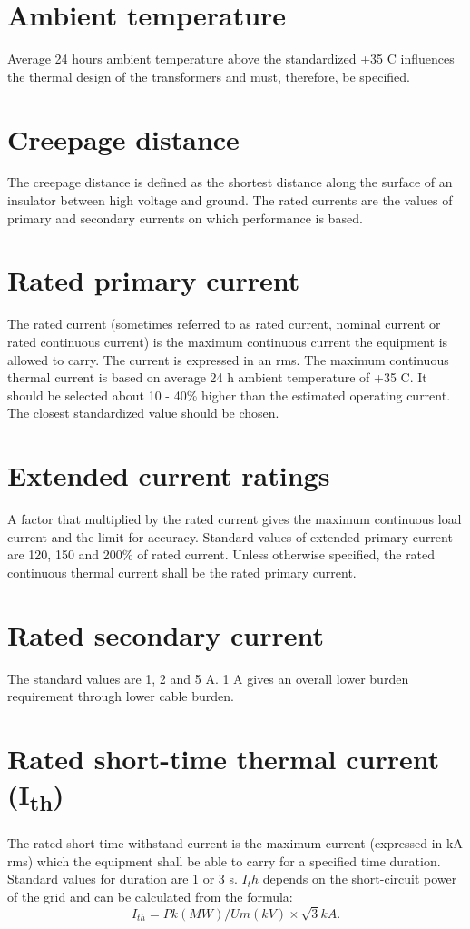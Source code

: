 \section*{Ambient temperature}
Average 24 hours ambient temperature above the standardized +35 \textdegree C influences the thermal design of the transformers and must, therefore, be specified.

\section*{Creepage distance}
The creepage distance is defined as the shortest distance along the surface of an insulator between high voltage and ground. The rated currents are the values of primary and secondary currents on which performance is based. 

\section*{Rated primary current}
The rated current (sometimes referred to as rated current, nominal current or rated continuous current) is the maximum continuous current the equipment is allowed to carry. The current is expressed in an rms. The maximum continuous thermal current is based on average 24 h ambient temperature of +35 \textdegree C. It should be selected about 10 - 40\% higher than the estimated operating current. The closest standardized value should be chosen.

\section*{Extended current ratings}
A factor that multiplied by the rated current gives the maximum continuous load current and the limit for accuracy. Standard values of extended primary current are 120, 150 and 200\% of rated current. Unless otherwise specified, the rated continuous thermal current shall be the rated primary current.
\section*{Rated secondary current}
The standard values are 1, 2 and 5 A. 1 A gives an overall lower burden requirement through lower cable burden.
\section*{Rated short-time thermal current (I\textsubscript{th})}
The rated short-time withstand current is the maximum current (expressed in kA rms) which the equipment shall be able to carry for a specified time duration. Standard values for duration are 1 or 3 s. $I_th$ depends on the short-circuit power of the grid and can be calculated from the formula:
\[
I_{th} = Pk (MW) / Um (kV) \times \sqrt{3} kA.
\]
